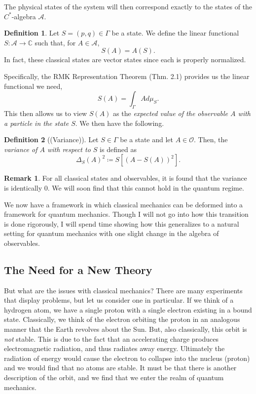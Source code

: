 \documentclass[leqno]{article}
\theoremstyle{definition}
\newtheorem{definition}{Definition}[section]
\newtheorem*{remark}{Remark}
\theoremstyle{remark}
\theoremstyle{theorem}
\newcommand{\A}{\mathcal{A}}
\newcommand{\C}{\mathbb{C}}
\newcommand{\opO}{\mathcal{O}}
\begin{document}
The physical states of the system will then correspond exactly to the states of the $C^*$-algebra $\A$. 

\begin{definition}
Let $S=(p,q)\in \Gamma$ be a state. We define the linear functional $S\colon \A \to \C$ such that, for $A\in \A$, 
\[
S(A)=A(S).
\]
In fact, these classical states are vector states since each is properly normalized.
\end{definition}

Specifically, the RMK Representation Theorem (Thm. 2.1) provides us the linear functional we need,
\[
S(A)=\int_\Gamma Ad\mu_S.
\]
This then allows us to view $S(A)$ as the \emph{expected value of the observable $A$ with a particle in the state $S$}.  We then have the following.

\begin{definition}[(Variance)]
Let $S\in \Gamma$ be a state and let $A\in \opO$. Then, the \emph{variance of $A$ with respect to $S$} is defined as
\[
\Delta_S(A)^2\coloneqq S\left[ (A-S(A))^2\right].
\]
\end{definition}

\begin{remark}
For all classical states and observables, it is found that the variance is identically 0.  We will soon find that this cannot hold in the quantum regime.
\end{remark}

We now have a framework in which classical mechanics can be deformed into a framework for quantum mechanics.  Though I will not go into how this transition is done rigorously, I will spend time showing how this generalizes to a natural setting for quantum mechanics with one slight change in the algebra of observables. 


\subsection{The Need for a New Theory}
But what are the issues with classical mechanics?  There are many experiments that display problems, but let us consider one in particular.  If we think of a hydrogen  atom, we have a single proton with a single electron existing in a bound state.  Classically, we think of the electron orbiting the proton in an analogous manner that the Earth revolves about the Sun.  But, also classically, this orbit is \emph{not} stable.  This is due to the fact that an accelerating charge produces electromagnetic radiation, and thus radiates away energy.  Ultimately the radiation of energy would cause the electron to collapse into the nucleus (proton) and we would find that no atoms are stable.  It must be that there is another description of the orbit, and we find that we enter the realm of quantum mechanics.
\end{document}
